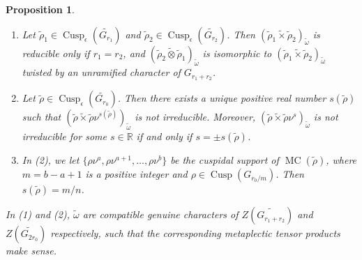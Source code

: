 \documentclass{amsart}
\numberwithin{equation}{section}
\newtheorem{proposition}[theorem]{\bf{Proposition}}
\newcommand{\mrcusp}{\operatorname{Cusp}}
\newcommand{\mrmc}{\operatorname{MC}}
\newcommand{\mbr}{\mathbb{R}}
\newcommand{\wt}[1]{\widetilde{#1}}
\begin{document}
	\begin{proposition}\label{propvaluesrho}
		
		\begin{enumerate}
			\item Let $\wt{\rho}_{1}\in\mrcusp_{\epsilon}(\wt{G_{r_{1}}})$ and $\wt{\rho}_{2}\in\mrcusp_{\epsilon}(\wt{G_{r_{2}}})$. Then $(\wt{\rho}_{1}\wt{\times}\wt{\rho}_{2})_{\wt{\omega}}$ is reducible only if $r_{1}=r_{2}$, and $(\wt{\rho}_{2}\wt{\otimes}\wt{\rho}_{1})_{\wt{\omega}}$ is isomorphic to $(\wt{\rho}_{1}\wt{\times}\wt{\rho}_{2})_{\wt{\omega}}$ twisted by an unramified character of $G_{r_{1}+r_{2}}$.
			
			\item Let $\wt{\rho}\in\mrcusp_{\epsilon}(\wt{G_{r_{0}}})$. Then there exists a unique positive real number $s(\wt{\rho})$ such
			that $(\wt{\rho}\wt{\times}\wt{\rho}\nu^{s(\wt{\rho})})_{\wt{\omega}}$ is not irreducible. Moreover, $(\wt{\rho}\wt{\times}\wt{\rho}\nu^{s})_{\wt{\omega}}$ is not irreducible for some $s\in\mbr$ if and only if $s=\pm s(\wt{\rho})$.
			
			\item  In (2), we let $\{\rho\nu^{a},\rho\nu^{a+1},\dots,\rho\nu^{b}\}$ be the cuspidal support of $\mrmc(\wt{\rho})$, where $m=b-a+1$ is a positive integer and $\rho\in\mrcusp(G_{r_{0}/m})$. Then $s(\wt{\rho})=m/n$.
			
		\end{enumerate} 
		In (1) and (2), $\wt{\omega}$ are compatible genuine characters of $Z(\wt{G_{r_{1}+r_{2}}})$ and $Z(\wt{G_{2r_{0}}})$ respectively, such that the corresponding metaplectic tensor products make sense.
		
	\end{proposition}
	
\end{document}
